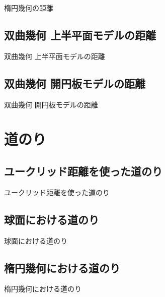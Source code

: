 楕円幾何の距離

\newpage


\subsection{ 双曲幾何 上半平面モデルの距離 }

双曲幾何 上半平面モデルの距離

\newpage


\subsection{ 双曲幾何 開円板モデルの距離 }

双曲幾何 開円板モデルの距離

\newpage


\section{ 道のり }

\newpage

\subsection{ ユークリッド距離を使った道のり }

ユークリッド距離を使った道のり

\newpage


\subsection{ 球面における道のり }

球面における道のり

\newpage


\subsection{ 楕円幾何における道のり }

楕円幾何における道のり

\newpage

